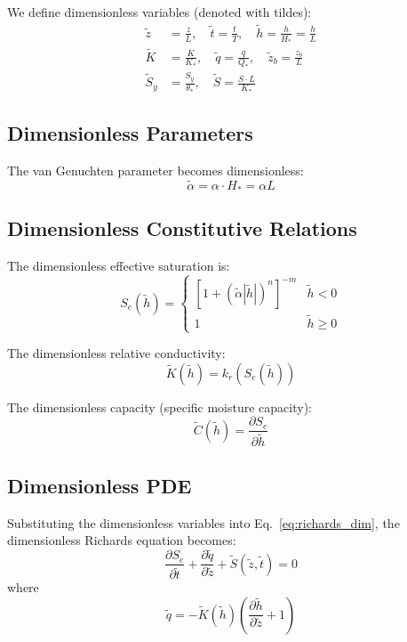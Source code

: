 \documentclass[11pt,a4paper]{article}
\begin{document}
We define dimensionless variables (denoted with tildes):
\begin{align}
    \tilde{z} &= \frac{z}{L}, \quad \tilde{t} = \frac{t}{T}, \quad \tilde{h} = \frac{h}{H_*} = \frac{h}{L} \\
    \tilde{K} &= \frac{K}{K_*}, \quad \tilde{q} = \frac{q}{Q_*}, \quad \tilde{z}_b = \frac{z_b}{L} \\
    \tilde{S}_y &= \frac{S_y}{\theta_*}, \quad \tilde{S} = \frac{S \cdot L}{K_*}
\end{align}

\subsection{Dimensionless Parameters}

The van Genuchten parameter becomes dimensionless:
\begin{equation}
    \tilde{\alpha} = \alpha \cdot H_* = \alpha L
\end{equation}

\subsection{Dimensionless Constitutive Relations}

The dimensionless effective saturation is:
\begin{equation}
    S_e(\tilde{h}) = \begin{cases}
        \left[1 + (\tilde{\alpha} |\tilde{h}|)^n\right]^{-m} & \tilde{h} < 0 \\
        1 & \tilde{h} \geq 0
    \end{cases}
\end{equation}

The dimensionless relative conductivity:
\begin{equation}
    \tilde{K}(\tilde{h}) = k_r(S_e(\tilde{h}))
\end{equation}

The dimensionless capacity (specific moisture capacity):
\begin{equation}
    \tilde{C}(\tilde{h}) = \frac{\partial S_e}{\partial \tilde{h}}
\end{equation}

\subsection{Dimensionless PDE}

Substituting the dimensionless variables into Eq.~\ref{eq:richards_dim}, the dimensionless Richards equation becomes:
\begin{equation}
    \frac{\partial S_e}{\partial \tilde{t}} + \frac{\partial \tilde{q}}{\partial \tilde{z}} + \tilde{S}(\tilde{z},\tilde{t}) = 0
    \label{eq:richards_dimless}
\end{equation}
where
\begin{equation}
    \tilde{q} = -\tilde{K}(\tilde{h})\left(\frac{\partial \tilde{h}}{\partial \tilde{z}} + 1\right)
\end{equation}
\end{document}
